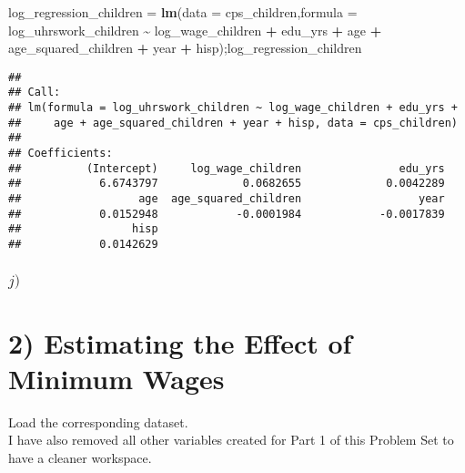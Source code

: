 \documentclass[
]{article}
\newenvironment{Shaded}{\begin{snugshade}}{\end{snugshade}}
\newcommand{\DataTypeTok}[1]{\textcolor[rgb]{0.13,0.29,0.53}{#1}}
\newcommand{\KeywordTok}[1]{\textcolor[rgb]{0.13,0.29,0.53}{\textbf{#1}}}
\newcommand{\NormalTok}[1]{#1}
\newcommand{\OperatorTok}[1]{\textcolor[rgb]{0.81,0.36,0.00}{\textbf{#1}}}
\newcommand{\StringTok}[1]{\textcolor[rgb]{0.31,0.60,0.02}{#1}}
\begin{document}
\begin{Shaded}
\begin{Highlighting}[]
\NormalTok{log\_regression\_children =}\StringTok{ }\KeywordTok{lm}\NormalTok{(}\DataTypeTok{data =}\NormalTok{ cps\_children,}\DataTypeTok{formula =}\NormalTok{ log\_uhrswork\_children }\OperatorTok{\textasciitilde{}}\StringTok{ }\NormalTok{log\_wage\_children }\OperatorTok{+}\StringTok{ }\NormalTok{edu\_yrs }\OperatorTok{+}\StringTok{ }\NormalTok{age }\OperatorTok{+}\StringTok{ }\NormalTok{age\_squared\_children }\OperatorTok{+}\StringTok{ }\NormalTok{year }\OperatorTok{+}\StringTok{ }\NormalTok{hisp);log\_regression\_children}
\end{Highlighting}
\end{Shaded}

\begin{verbatim}
## 
## Call:
## lm(formula = log_uhrswork_children ~ log_wage_children + edu_yrs + 
##     age + age_squared_children + year + hisp, data = cps_children)
## 
## Coefficients:
##          (Intercept)     log_wage_children               edu_yrs  
##            6.6743797             0.0682655             0.0042289  
##                  age  age_squared_children                  year  
##            0.0152948            -0.0001984            -0.0017839  
##                 hisp  
##            0.0142629
\end{verbatim}

\hfill\break
\hfill\break
\hfill\break

\hypertarget{j}{%
\subsubsection{\texorpdfstring{\(j)\)}{j)}}\label{j}}

\hfill\break

\hfill\break
\hfill\break
\hfill\break
\hfill\break
\hfill\break

\hypertarget{estimating-the-effect-of-minimum-wages}{%
\section{2) Estimating the Effect of Minimum
Wages}\label{estimating-the-effect-of-minimum-wages}}

\hfill\break
\hfill\break
Load the corresponding dataset.\\
I have also removed all other variables created for Part 1 of this
Problem Set to have a cleaner workspace.\\
\end{document}
